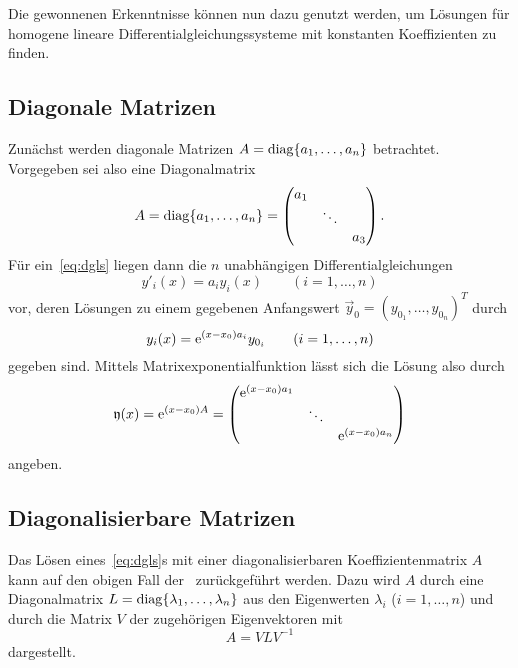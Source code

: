 Die gewonnenen Erkenntnisse können nun dazu genutzt werden,
um Lösungen für homogene lineare Differentialgleichungssysteme mit konstanten Koeffizienten zu finden.

\subsection{Diagonale Matrizen}\label{subsec:03-01}
Zunächst werden diagonale Matrizen $A = \operatorname{diag}\{a_1,\dots,a_n\}$ betrachtet.
Vorgegeben sei also eine Diagonalmatrix
\begin{equation*}
    A = \operatorname{diag}\{a_1,\dots,a_n\}
    = \begin{pmatrix}
          a_1 &        & \\
              & \ddots & \\
              &        & a_3
    \end{pmatrix}.
\end{equation*}
Für ein~\ref{eq:dgls} liegen dann die $n$ unabhängigen Differentialgleichungen
\begin{equation*}
    y'_i(x) = a_i y_i(x) \qquad (i = 1,\dots,n)
\end{equation*}
vor, deren Lösungen zu einem gegebenen Anfangswert $\vec{y}_0 = (y_{0_1},\dots,y_{0_n})^T$ durch
\begin{equation*}
    y_i(x) = \mathrm{e}^{(x - x_0) a_i} y_{0_i} \qquad (i = 1,\dots,n)
\end{equation*}
gegeben sind.
Mittels Matrixexponentialfunktion lässt sich die Lösung also durch
\begin{equation*}
    \mathfrak{y}(x) = \mathrm{e}^{(x - x_0) A}
    = \begin{pmatrix}
        \mathrm{e}^{(x - x_0) a_1} &        & \\
                   & \ddots & \\
                   &        & \mathrm{e}^{(x - x_0) a_n}
    \end{pmatrix}
\end{equation*}
angeben.

\subsection{Diagonalisierbare Matrizen}\label{subsec:03-02}
Das Lösen eines~\ref{eq:dgls}s mit einer diagonalisierbaren Koeffizientenmatrix $A$ kann auf den obigen Fall der~
zurückgeführt werden.
Dazu wird $A$ durch eine Diagonalmatrix $L = \operatorname{diag}\{\lambda_1,\dots,\lambda_n\}$ aus den Eigenwerten $\lambda_i$ ($i = 1,\dots,n$)
und durch die Matrix $V$ der zugehörigen Eigenvektoren mit
\begin{equation*}
    A = V L V^{-1}
\end{equation*}
dargestellt.

